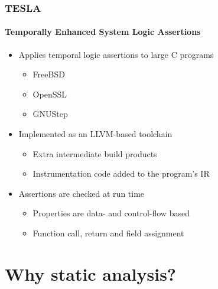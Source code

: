\documentclass{beamer}
\begin{document}
\begin{frame}
  \frametitle{TESLA}
  \framesubtitle{\textbf{T}emporally \textbf{E}nhanced \textbf{S}ystem
  \textbf{L}ogic \textbf{A}ssertions}

  \begin{itemize}
    \item Applies temporal logic assertions to large C programs
      \begin{itemize}
        \item FreeBSD
        \item OpenSSL
        \item GNUStep
      \end{itemize}

    \item Implemented as an LLVM-based toolchain
      \begin{itemize}
        \item Extra intermediate build products
        \item Instrumentation code added to the program's IR
      \end{itemize}

    \item Assertions are checked at run time
      \begin{itemize}
        \item Properties are data- and control-flow based
        \item Function call, return and field assignment
      \end{itemize}
  \end{itemize}
\end{frame}

\section{Why static analysis?}
\end{document}
